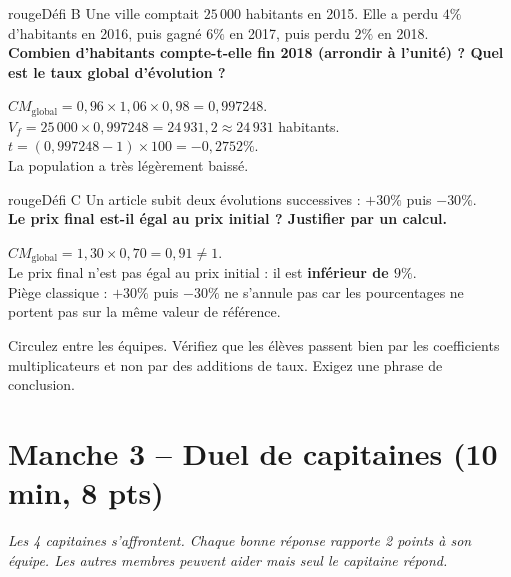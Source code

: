 \documentclass[12pt,a4paper]{article}
\begin{document}
\begin{carte}{rouge}{Défi B}
Une ville comptait \(25\,000\) habitants en 2015. Elle a perdu \(4\%\) d'habitants en 2016, puis gagné \(6\%\) en 2017, puis perdu \(2\%\) en 2018.\\[0.2cm]
\textbf{Combien d'habitants compte-t-elle fin 2018 (arrondir à l'unité) ? Quel est le taux global d'évolution ?}
\end{carte}
\begin{corrige}
\(CM_{\text{global}} = 0{,}96 \times 1{,}06 \times 0{,}98 = 0{,}997248\).\\[0.2cm]
\(V_f = 25\,000 \times 0{,}997248 = 24\,931{,}2 \approx 24\,931\) habitants.\\[0.2cm]
\(t = (0{,}997248 - 1) \times 100 = -0{,}2752\%\).\\[0.2cm]
La population a très légèrement baissé.
\end{corrige}

\begin{carte}{rouge}{Défi C}
Un article subit deux évolutions successives : \(+30\%\) puis \(-30\%\).\\[0.2cm]
\textbf{Le prix final est-il égal au prix initial ? Justifier par un calcul.}
\end{carte}
\begin{corrige}
\(CM_{\text{global}} = 1{,}30 \times 0{,}70 = 0{,}91 \neq 1\).\\[0.2cm]
Le prix final n'est pas égal au prix initial : il est \textbf{inférieur de \(9\%\)}.\\[0.2cm]
Piège classique : \(+30\%\) puis \(-30\%\) ne s'annule pas car les pourcentages ne portent pas sur la même valeur de référence.
\end{corrige}

\begin{conseil}
Circulez entre les équipes. Vérifiez que les élèves passent bien par les coefficients multiplicateurs et non par des additions de taux. Exigez une phrase de conclusion.
\end{conseil}

\newpage

\section*{Manche 3 -- Duel de capitaines (10 min, 8 pts)}

\textit{Les 4 capitaines s'affrontent. Chaque bonne réponse rapporte 2 points à son équipe. Les autres membres peuvent aider mais seul le capitaine répond.}
\end{document}

